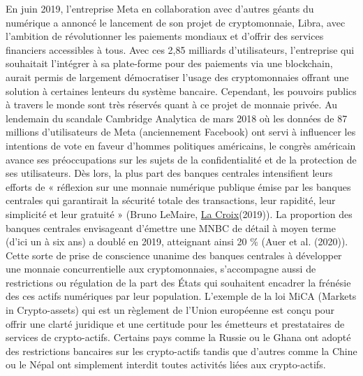 \documentclass[12pt]{article}
\begin{document}
En juin 2019, l'entreprise Meta en collaboration avec d’autres géants du numérique a annoncé le lancement de son projet de cryptomonnaie, Libra, avec l'ambition de révolutionner les paiements mondiaux et d'offrir des services financiers accessibles à tous. Avec ces 2,85 milliards d’utilisateurs, l’entreprise qui souhaitait l’intégrer à sa plate-forme pour des paiements via une blockchain, aurait permis de largement démocratiser l’usage des cryptomonnaies offrant une solution à certaines lenteurs du système bancaire. Cependant, les pouvoirs publics à travers le monde sont très réservés quant à ce projet de monnaie privée. Au lendemain du scandale Cambridge Analytica de mars 2018 où les données de 87 millions d’utilisateurs de Meta (anciennement Facebook) ont servi à influencer les intentions de vote en faveur d'hommes politiques américains, le congrès américain avance ses préoccupations sur les sujets de la confidentialité et de la protection de ses utilisateurs. Dès lors, la plus part des banques centrales intensifient leurs efforts de « réflexion sur une monnaie numérique publique émise par les banques centrales qui garantirait la sécurité totale des transactions, leur rapidité, leur simplicité et leur gratuité » (Bruno LeMaire, \href{https://www.la-croix.com/Economie/France/Bruno-Le-Maire-LEurope-doit-etre-continent-capitalisme-responsable-2019-09-05-1201045525}{La Croix}(2019)). La proportion des banques centrales envisageant d'émettre une MNBC de détail à moyen terme (d'ici un à six ans) a doublé en 2019, atteignant ainsi 20 \% (Auer et al. (2020)). Cette sorte de prise de conscience unanime des banques centrales à développer une monnaie concurrentielle aux cryptomonnaies, s'accompagne aussi de restrictions ou régulation de la part des États qui souhaitent encadrer la frénésie des ces actifs numériques par leur population. L'exemple de la loi MiCA (Markets in Crypto-assets) qui est un règlement de l'Union européenne est conçu pour offrir une clarté juridique et une certitude pour les émetteurs et prestataires de services de crypto-actifs. Certains pays comme la Russie ou le Ghana ont adopté des restrictions bancaires sur les crypto-actifs tandis que d'autres comme la Chine ou le Népal ont simplement interdit toutes activités liées aux crypto-actifs. \\
\end{document}
